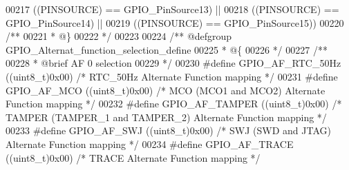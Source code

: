 \begin{DoxyCode}
00217                                        \textcolor{preprocessor}{(}\textcolor{preprocessor}{(}\textcolor{preprocessor}{PINSOURCE}\textcolor{preprocessor}{)} \textcolor{preprocessor}{==} GPIO_PinSource13\textcolor{preprocessor}{)} \textcolor{preprocessor}{||}
00218                                        \textcolor{preprocessor}{(}\textcolor{preprocessor}{(}\textcolor{preprocessor}{PINSOURCE}\textcolor{preprocessor}{)} \textcolor{preprocessor}{==} GPIO_PinSource14\textcolor{preprocessor}{)} \textcolor{preprocessor}{||}
00219                                        \textcolor{preprocessor}{(}\textcolor{preprocessor}{(}\textcolor{preprocessor}{PINSOURCE}\textcolor{preprocessor}{)} \textcolor{preprocessor}{==} GPIO_PinSource15\textcolor{preprocessor}{)}\textcolor{preprocessor}{)}
00220 \textcolor{comment}{/**}
00221 \textcolor{comment}{  * @\}}
00222 \textcolor{comment}{  */}
00223 
00224 \textcolor{comment}{/** @defgroup GPIO\_Alternat\_function\_selection\_define }
00225 \textcolor{comment}{  * @\{}
00226 \textcolor{comment}{  */}
00227 \textcolor{comment}{/** }
00228 \textcolor{comment}{  * @brief   AF 0 selection  }
00229 \textcolor{comment}{  */}
00230 \textcolor{preprocessor}{#}\textcolor{preprocessor}{define} \textcolor{preprocessor}{GPIO\_AF\_RTC\_50Hz}      \textcolor{preprocessor}{(}\textcolor{preprocessor}{(}\textcolor{preprocessor}{uint8\_t}\textcolor{preprocessor}{)}0x00\textcolor{preprocessor}{)}  \textcolor{comment}{/* RTC\_50Hz Alternate Function mapping */}
00231 \textcolor{preprocessor}{#}\textcolor{preprocessor}{define} \textcolor{preprocessor}{GPIO\_AF\_MCO}           \textcolor{preprocessor}{(}\textcolor{preprocessor}{(}\textcolor{preprocessor}{uint8\_t}\textcolor{preprocessor}{)}0x00\textcolor{preprocessor}{)}  \textcolor{comment}{/* MCO (MCO1 and MCO2) Alternate Function mapping */}
00232 \textcolor{preprocessor}{#}\textcolor{preprocessor}{define} \textcolor{preprocessor}{GPIO\_AF\_TAMPER}        \textcolor{preprocessor}{(}\textcolor{preprocessor}{(}\textcolor{preprocessor}{uint8\_t}\textcolor{preprocessor}{)}0x00\textcolor{preprocessor}{)}  \textcolor{comment}{/* TAMPER (TAMPER\_1 and TAMPER\_2) Alternate Function
       mapping */}
00233 \textcolor{preprocessor}{#}\textcolor{preprocessor}{define} \textcolor{preprocessor}{GPIO\_AF\_SWJ}           \textcolor{preprocessor}{(}\textcolor{preprocessor}{(}\textcolor{preprocessor}{uint8\_t}\textcolor{preprocessor}{)}0x00\textcolor{preprocessor}{)}  \textcolor{comment}{/* SWJ (SWD and JTAG) Alternate Function mapping */}
00234 \textcolor{preprocessor}{#}\textcolor{preprocessor}{define} \textcolor{preprocessor}{GPIO\_AF\_TRACE}         \textcolor{preprocessor}{(}\textcolor{preprocessor}{(}\textcolor{preprocessor}{uint8\_t}\textcolor{preprocessor}{)}0x00\textcolor{preprocessor}{)}  \textcolor{comment}{/* TRACE Alternate Function mapping */}

\end{DoxyCode}
